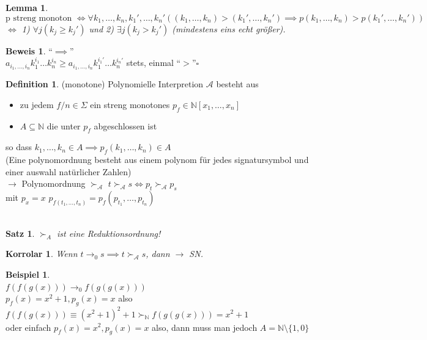 \documentclass{article}
\newcommand{\smallAscr}{\scriptscriptstyle\mathcal{A}}
\newtheorem{satz}{Satz}
\newtheorem{korrolar}{Korrolar}[section]
\newtheorem{lemma}{Lemma}[section]
\theoremstyle{definition}
\newtheorem{beweis}{Beweis}[section]
\newtheorem{beispiel}{Beispiel}[section]
\newtheorem{definition}{Definition}[section]
\begin{document}
	\begin{lemma}
	\[\text {p streng monoton }\iff \forall k_1,\dots, k_n,k_1',\dots,k_n'((k_1,\dots, k_n)>(k_1',\dots,k_n')\implies p(k_1,\dots, k_n)>p(k_1',\dots,k_n'))\]
	$\iff$ 1) $\forall j(k_j\geq k_j')$ und 2) $\exists j(k_j>k_j')$ (mindestens eins echt größer).
	\end{lemma}
	\begin{beweis}
	``$\implies$''\\
	$a_{i_1,\dots,i_n}k_1^{i_1}\dots k_n^{i_n}\geq a_{i_1,\dots,i_n}k_1^{i_1'}\dots k_n^{i_n'}$ stets, einmal ``$>$''$\square$
	\end{beweis}
	\begin{definition} 
	(monotone) Polynomielle Interpretion $\mathscr{A}$ besteht aus
	\end{definition}
	\begin{itemize}
	\item zu jedem $f/n\in\Sigma$ ein streng monotones $ p_f\in\mathbb{N}[x_1,\dots,x_n]$ 
	\item $A\subseteq \mathbb{N}$ die unter $p_f$ abgeschlossen ist
	\end{itemize}
	so dass $k_1,\dots,k_n\in A\implies p_f(k_1,\dots, k_n)\in A$\\
	(Eine polynomordnung besteht aus einem polynom für jedes signatursymbol und einer auswahl natürlicher Zahlen)\\
	$\to$ Polynomordnung $\succ_{\smallAscr}$
	$t\succ_{\smallAscr} s\iff p_t\succ_{\smallAscr} p_s$\\
	mit $p_x=x$ $p_{f(t_1,\dots,t_n)} = p_f(p_{t_1},\dots,p_{t_n})$\\
	\\
	\begin{satz}
	$\succ_A$ ist eine Reduktionsordnung!\\
	\end{satz}
	\begin{korrolar}
	Wenn $t\to_0 s\implies t\succ_{\smallAscr} s$, dann $\to$ SN.
	\end{korrolar}
	\begin{beispiel}\ \\
	$f(f(g(x)))\to_0 f(g(g(x)))$\\
	$p_f(x)=x^2+1, p_g(x)=x$ also
	$f(f(g(x)))\equiv (x^2+1)^2+1\succ_\mathbb{N} f(g(g(x))) = x^2+1$\\
	oder einfach $p_f(x)=x^2, p_g(x)=x$ also, dann muss man jedoch $A=\mathbb{N}\setminus\{1,0\}$\\
	\end{beispiel}
\end{document}
